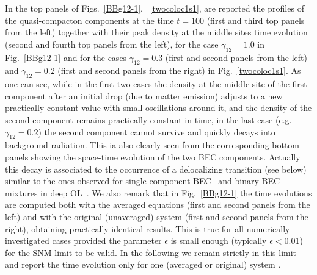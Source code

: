 \documentclass[12pt]{iopart}
\begin{document}
In the top panels of Figs.~\ref{BBg12-1}, ~\ref{twocoloc1s1},  are reported the profiles of the quasi-compacton components at the time $t=100$ (first and third top panels from the left)  together with their peak density at the middle sites time evolution (second and fourth top   panels from the left), for the case $\gamma_{12}=1.0$ in Fig.~\ref{BBg12-1} and for the cases $\gamma_{12}=0.3$ (first and second panels from the left) and $\gamma_{12}=0.2$ (first and second panels from the right) in  Fig.~\ref{twocoloc1s1}. As one can see, while in the first two cases the density at the middle site of the first component after  an initial drop (due to matter emission)  adjusts to a new practically constant value with small oscillations around it, and  the density of the second component remains practically constant in time, in the last case (e.g. $\gamma_{12}=0.2$) the second component cannot survive and quickly decays into background radiation.  This ia also clearly seen from the corresponding bottom panels showing the space-time evolution of the two BEC components. Actually this decay is associated to the occurrence of  a delocalizing transition (see below) similar to the ones observed for single component BEC~\cite{Baizakov} and binary BEC mixtures in deep OL~\cite{cruz2009}. We also remark that in Fig.~\ref{BBg12-1} the time evolutions are computed both with the averaged equations (first and second panels from the left)   and with the original (unaveraged) system (first and second panels from the right), obtaining  practically identical  results. This is true for all numerically investigated cases  provided the parameter $\epsilon$ is small enough (typically $\epsilon < 0.01$) for the SNM limit to be valid. In the following  we remain strictly in this limit and  report the time evolution only for one (averaged or original) system .
\end{document}
